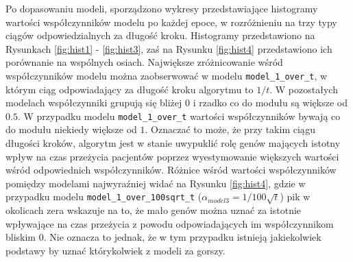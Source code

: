 \begin{Shaded}
\begin{Highlighting}[]
\NormalTok{coxData_split[}\NormalTok{:}\NormalTok{] ->}\StringTok{ }
\NormalTok{coxData_split[}\NormalTok{:}\NormalTok{] ->}\StringTok{ }
  \NormalTok{) ->}\StringTok{ }
  \NormalTok{,}
          \NormalTok{/(}\NormalTok{*}\StringTok{ }
  \NormalTok{,}
          \NormalTok{/(}\NormalTok{*}\StringTok{ }
\end{Highlighting}
\end{Shaded}


Po dopasowaniu modeli, sporządzono wykresy przedstawiające histogramy wartości współczynników modelu po każdej epoce, w rozróżnieniu na trzy typy ciągów odpowiedzialnych za długość kroku. Histogramy przedstawiono na Rysunkach \ref{fig:hist1} - \ref{fig:hist3}, zaś na Rysunku \ref{fig:hist4} przedstawiono ich porównanie na wspólnych osiach. Największe zróżnicowanie wśród współczynników modelu można zaobserwować w modelu \texttt{model\_1\_over\_t}, w którym ciąg odpowiadający za długość kroku algorytmu to $1/t$. W pozostałych modelach współczynniki grupują się bliżej $0$ i rzadko co do modułu są większe od $0.5$. W przypadku modelu \texttt{model\_1\_over\_t} wartości współczynników bywają co do modułu niekiedy większe od $1$. Oznaczać to może, że przy takim ciągu długości kroków, algorytm jest w stanie uwypuklić rolę genów mających istotny wpływ na czas przeżycia pacjentów poprzez wyestymowanie większych wartości wśród odpowiednich współczynników. Różnice wśród wartości współczynników pomiędzy modelami najwyraźniej widać na Rysunku \ref{fig:hist4}, gdzie w przypadku modelu \texttt{model\_1\_over\_100sqrt\_t} ($\alpha_{model3} = 1/100\sqrt{t}$) pik w okolicach zera wskazuje na to, że mało genów można uznać za istotnie wpływające na czas przeżycia z powodu odpowiadających im współczynnikom bliskim $0$. Nie oznacza to jednak, że w tym przypadku istnieją jakiekolwiek podstawy by uznać którykolwiek z modeli za gorszy.


